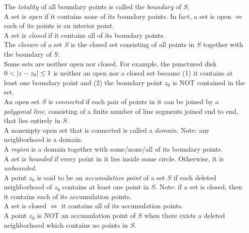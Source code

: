 \documentclass{book}
\theoremstyle{definition}
\begin{document}
The \textit{totality} of all boundary points is called the \textit{boundary} of $S$. \\

A set is \textit{open} if it contains none of its boundary points. In fact, a set is open $\iff$ each of its points is an interior point. \\

A set is \textit{closed} if it contains all of its boundary points. \\

The \textit{closure} of a set $S$ is the closed set consisting of all points in $S$ together with the boundary of $S$. \\

Some sets are neither open nor closed. For example, the punctured disk $0 < \abs{z - z_0} \leq 1$ is neither an open nor a closed set because (1) it contains at least one boundary point and (2) the boundary point $z_0$ is NOT contained in the set. \\


An open set $S$ is \textit{connected} if each pair of points in it can be joined by a \textit{polygonal line}, consisting of a finite number of line segments joined end to end, that lies entirely in $S$. \\

A nonempty open set that is connected is called a \textit{domain}. Note: any neighborhood is a domain. \\

A \textit{region} is a domain together with some/none/all of its boundary points. \\

A set is \textit{bounded} if every point in it lies inside some circle. Otherwise, it is \textit{unbounded}. \\

A point $z_0$ is said to be an \textit{accumulation point} of a set $S$ if each deleted neighborhood of $z_0$ contains at least one point in $S$. Note: if a set is closed, then it contains each of its accumulation points. \\

A set is closed $\iff$ it contains all of its accumulation points. \\

A point $z_0$ is NOT an accumulation point of $S$ when there exists a deleted neighborhood which contains no points in $S$. 
\end{document}
